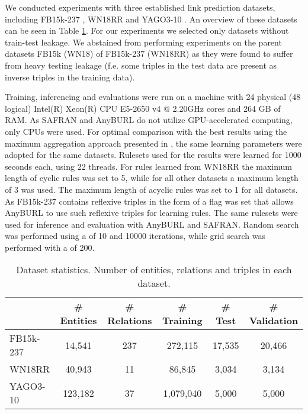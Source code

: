 \documentclass[akbc,twoside,11pt,lettersize]{article}
\begin{document}
We conducted experiments with three established link prediction datasets, including FB15k-237 \cite{toutanova_2015}, WN18RR \cite{dettmers_2018} and YAGO3-10 \cite{dettmers_2018}. An overview of these datasets can be seen in Table \ref{datasetsoverview}. For our experiments we selected only datasets without train-test leakage. We abstained from performing experiments on the parent datasets FB15k (WN18) \cite{bordes_2013} of FB15k-237 (WN18RR) as they were found to suffer from heavy testing leakage (f.e. some triples in the test data are present as inverse triples in the training data).


Training, inferencing and evaluations were run on a machine with 24 physical (48 logical) Intel(R) Xeon(R) CPU E5-2650 v4 @ 2.20GHz cores and 264 GB of RAM. As SAFRAN and AnyBURL do not utilize GPU-accelerated computing, only CPUs were used. For optimal comparison with the best results using the maximum aggregation approach presented in \cite{meilicke_2020}, the same learning parameters were adopted for the same datasets. Rulesets used for the results were learned for 1000 seconds each, using 22 threads. For rules learned from WN18RR the maximum length of cyclic rules was set to 5, while for all other datasets a maximum length of 3 was used. The maximum length of acyclic rules was set to 1 for all datasets. As FB15k-237 contains reflexive triples in the form of  a flag was set that allows AnyBURL to use such reflexive triples for learning rules. The same rulesets were used for inference and evaluation with AnyBURL and SAFRAN. Random search was performed using a  of 10 and 10000 iterations, while grid search was performed with a  of 200.


\begin{table}[t]
\centering
\begin{tabular}{lccccc}
\hline
          & \# Entities & \# Relations & \# Training & \# Test & \# Validation \\ \hline
FB15k-237 & 14,541   & 237       & 272,115      & 17,535   & 20,466         \\
WN18RR    & 40,943   & 11        & 86,845       & 3,034    & 3,134          \\
YAGO3-10  & 123,182  & 37        & 1,079,040    & 5,000    & 5,000          \\
\hline
\end{tabular}
\caption{ Dataset statistics. Number of entities, relations and triples in each dataset. }
\label{datasetsoverview}
\end{table}
\end{document}
